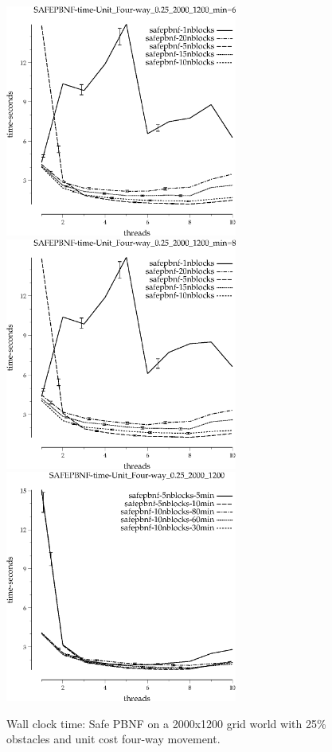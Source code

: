 \documentclass{article}
\begin{document}
\begin{appendices}
\begin{figure}[h]
\begin{center}
\includegraphics[width=3in]{../graphs/grid_unit_four-way_0.25_2000_1200/SAFEPBNF-time-Unit_Four-way_0.25_2000_1200_min=60.eps}
\includegraphics[width=3in]{../graphs/grid_unit_four-way_0.25_2000_1200/SAFEPBNF-time-Unit_Four-way_0.25_2000_1200_min=80.eps}
\includegraphics[width=3in]{../graphs/grid_unit_four-way_0.25_2000_1200/SAFEPBNF-time-Unit_Four-way_0.25_2000_1200.eps}
\caption{Wall clock time: Safe PBNF on a 2000x1200 grid world with 25\%
  obstacles and unit cost four-way movement.}
\end{center}
\end{figure}


\end{appendices}
\end{document}
